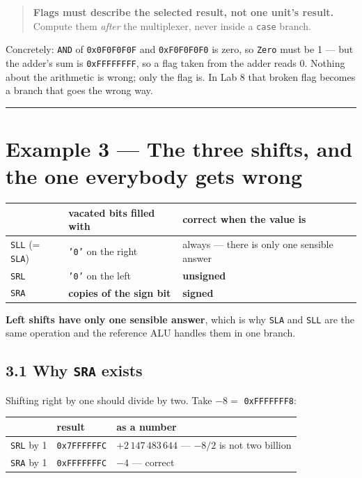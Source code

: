 \documentclass[11pt]{article}
\newcommand{\code}[1]{\texttt{#1}}
\newcommand{\hr}{\vspace{2pt}\hrule\vspace{6pt}}
\begin{document}
\begin{quote}
\textbf{Flags must describe the selected result, not one unit's result.} Compute
them \emph{after} the multiplexer, never inside a \code{case} branch.
\end{quote}

Concretely: \code{AND} of \code{0x0F0F0F0F} and \code{0xF0F0F0F0} is zero, so
\code{Zero} must be 1 --- but the adder's sum is \code{0xFFFFFFFF}, so a flag
taken from the adder reads 0. Nothing about the arithmetic is wrong; only the flag
is. In Lab 8 that broken flag becomes a branch that goes the wrong way.

\vspace{4pt}\hr

\section*{Example 3 --- The three shifts, and the one everybody gets wrong}

\begin{center}
\begin{tabular}{lll}
\toprule
& vacated bits filled with & correct when the value is \\
\midrule
\code{SLL} (= \code{SLA}) & \code{'0'} on the right & always --- there is only one sensible answer \\
\code{SRL} & \code{'0'} on the left & \textbf{unsigned} \\
\code{SRA} & \textbf{copies of the sign bit} & \textbf{signed} \\
\bottomrule
\end{tabular}
\end{center}

\textbf{Left shifts have only one sensible answer}, which is why \code{SLA} and
\code{SLL} are the same operation and the reference ALU handles them in one
branch.

\subsection*{3.1 Why \code{SRA} exists}

Shifting right by one should divide by two. Take $-8 =$ \code{0xFFFFFFF8}:

\begin{center}
\begin{tabular}{lll}
\toprule
& result & as a number \\
\midrule
\code{SRL} by 1 & \code{0x7FFFFFFC} & $+2\,147\,483\,644$ \quad --- $-8/2$ is not two billion \\
\code{SRA} by 1 & \code{0xFFFFFFFC} & $-4$ \quad --- correct \\
\bottomrule
\end{tabular}
\end{center}
\end{document}
